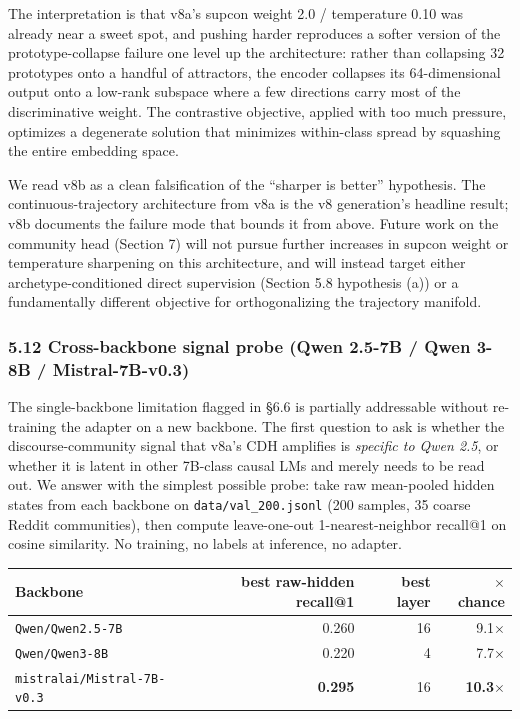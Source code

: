 \documentclass[
  11pt]{article}
\newcounter{none} %
\begin{document}
The interpretation is that v8a's supcon weight 2.0 / temperature 0.10
was already near a sweet spot, and pushing harder reproduces a softer
version of the prototype-collapse failure one level up the architecture:
rather than collapsing 32 prototypes onto a handful of attractors, the
encoder collapses its 64-dimensional output onto a low-rank subspace
where a few directions carry most of the discriminative weight. The
contrastive objective, applied with too much pressure, optimizes a
degenerate solution that minimizes within-class spread by squashing the
entire embedding space.

We read v8b as a clean falsification of the ``sharper is better''
hypothesis. The continuous-trajectory architecture from v8a is the v8
generation's headline result; v8b documents the failure mode that bounds
it from above. Future work on the community head (Section 7) will not
pursue further increases in supcon weight or temperature sharpening on
this architecture, and will instead target either archetype-conditioned
direct supervision (Section 5.8 hypothesis (a)) or a fundamentally
different objective for orthogonalizing the trajectory manifold.

\subsubsection{5.12 Cross-backbone signal probe (Qwen 2.5-7B / Qwen 3-8B
/
Mistral-7B-v0.3)}\label{cross-backbone-signal-probe-qwen-2.5-7b-qwen-3-8b-mistral-7b-v0.3}

The single-backbone limitation flagged in §6.6 is partially addressable
without re-training the adapter on a new backbone. The first question to
ask is whether the discourse-community signal that v8a's CDH amplifies
is \emph{specific to Qwen 2.5}, or whether it is latent in other
7B-class causal LMs and merely needs to be read out. We answer with the
simplest possible probe: take raw mean-pooled hidden states from each
backbone on \texttt{data/val\_200.jsonl} (200 samples, 35 coarse Reddit
communities), then compute leave-one-out 1-nearest-neighbor recall@1 on
cosine similarity. No training, no labels at inference, no adapter.

{\def\LTcaptype{none} %
\begin{longtable}[]{@{}lrrr@{}}
\toprule\noalign{}
Backbone & best raw-hidden recall@1 & best layer & \(\times\) chance \\
\midrule\noalign{}
\endhead
\bottomrule\noalign{}
\endlastfoot
\texttt{Qwen/Qwen2.5-7B} & 0.260 & 16 & 9.1\(\times\) \\
\texttt{Qwen/Qwen3-8B} & 0.220 & 4 & 7.7\(\times\) \\
\texttt{mistralai/Mistral-7B-v0.3} & \textbf{0.295} & 16 &
\textbf{10.3\(\times\)} \\
\end{longtable}
}
\end{document}
